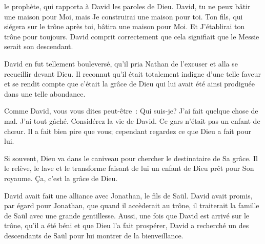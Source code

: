  le prophète, qui rapporta à David
 les paroles de Dieu.
 \og David, tu ne peux bâtir une maison pour Moi, mais Je construirai
 une maison pour toi.
 Ton fils, qui siégera sur le trône après toi, bâtira une maison pour Moi.
 Et J'établirai ton trône pour toujours. \fg{}
 David comprit correctement que cela signifiait
 que le Messie serait son descendant. 

David en fut tellement bouleversé, qu'il pria Nathan de l'excuser
 et alla se recueillir devant Dieu.
 Il reconnut qu'il était totalement indigne d'une telle faveur
 et se rendit compte que c'était la grâce de Dieu qui lui avait été ainsi
 prodiguée dans une telle abondance. 

Comme David, vous vous dites peut-être~:
 \og Qui suis-je? J'ai fait quelque chose de mal. J'ai tout gâché. \fg{}
 Considérez la vie de David. Ce gars n'était pas un enfant de ch\oe{}ur.
 Il a fait bien pire que vous; cependant regardez ce que Dieu a fait pour lui.


Si souvent, Dieu va dans le caniveau pour chercher le destinataire de Sa grâce.
 Il le relève, le lave et le transforme \ocadr faisant de lui un enfant de Dieu
 prêt pour Son royaume. Ça, c'est la grâce de Dieu. 

\dvrule






 David avait fait
 une alliance avec Jonathan, le fils de Saül.
 David avait promis, par égard pour Jonathan,
 que quand il accèderait au trône, il traiterait la famille de Saül
 avec une grande gentillesse.
 Aussi, une fois que David est arrivé sur le trône,
 qu'il a été béni et que Dieu l'a fait prospérer,
 David a recherché un des descendants de Saül
 pour lui montrer de la bienveillance. 

